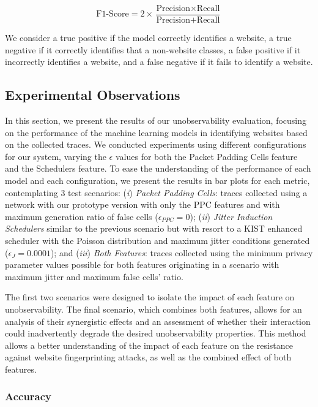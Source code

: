 \[
\text{F1-Score} = 2 \times \frac{\text{Precision} \times \text{Recall}}{\text{Precision} + \text{Recall}}
\]


We consider a true positive if the model correctly identifies a website, a true negative if it correctly identifies that a non-website classes, a false positive if it incorrectly identifies a website, and a false negative if it fails to identify a website. 

\subsection{Experimental Observations}\label{sec:experimental_observations_unobservability}

In this section, we present the results of our unobservability evaluation, focusing on the performance of the machine learning models in identifying websites based on the collected traces. We conducted experiments using different configurations for our system, varying the $\epsilon$ values for both the Packet Padding Cells feature and the Schedulers feature. To ease the understanding of the performance of each model and each configuration, we present the results in bar plots for each metric, contemplating 3 test scenarios: (\emph{i}) \textit{Packet Padding Cells}: traces collected using a network with our prototype version with only the PPC features and with maximum generation ratio of false cells ($\epsilon_{PPC} = 0$); (\emph{ii}) \textit{Jitter Induction Schedulers} similar to the previous scenario but with resort to a KIST enhanced scheduler with the Poisson distribution and maximum jitter conditions generated ($\epsilon_{J} = 0.0001$); and (\emph{iii}) \textit{Both Features}: traces collected using the minimum privacy parameter values possible for both features originating in a scenario with maximum jitter and maximum false cells' ratio. 

The first two scenarios were designed to isolate the impact of each feature on unobservability. The final scenario, which combines both features, allows for an analysis of their synergistic effects and an assessment of whether their interaction could inadvertently degrade the desired unobservability properties.
This method allows a better understanding of the impact of each feature on the resistance against website fingerprinting attacks, as well as the combined effect of both features.

\subsubsection{Accuracy}

